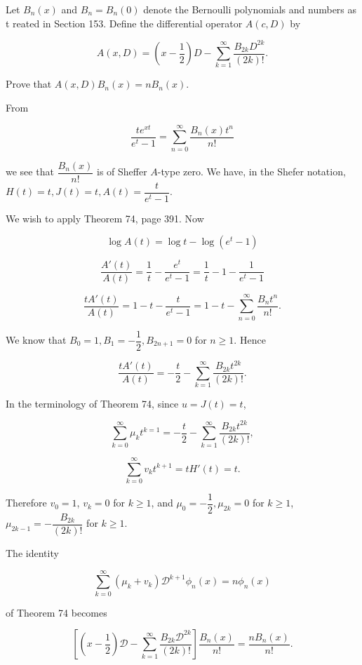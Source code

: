 \begin{problem}\label{problem2chapter18}
Let $B_n(x)$ and $B_n=B_n(0)$ denote the Bernoulli polynomials and numbers as t reated in Section 153. Define the differential operator $A(c,D)$ by 

$$A(x,D) = \left( x - \dfrac{1}{2} \right)D - \displaystyle\sum_{k=1}^{\infty} \dfrac{B_{2k}D^{2k}}{(2k)!}.$$

Prove that $A(x,D)B_n(x) = nB_n(x)$.
\end{problem}
\begin{solution}
From

$$\dfrac{te^{xt}}{e^t-1} = \displaystyle\sum_{n=0}^{\infty} \dfrac{B_n(x)t^n}{n!}$$

we see that $\dfrac{B_n(x)}{n!}$ is of Sheffer $A$-type zero. We have, in the Shefer notation, $H(t)=t, J(t)=t, A(t) = \dfrac{t}{e^t-1}.$ 

We wish to apply Theorem 74, page 391. Now 

$$\log A(t) = \log t - \log(e^t-1)$$

$$\dfrac{A'(t)}{A(t)} = \dfrac{1}{t} - \dfrac{e^t}{e^t-1} = \dfrac{1}{t} - 1 - \dfrac{1}{e^t-1}$$

$$\dfrac{tA'(t)}{A(t)} = 1-t-\dfrac{t}{e^t-1} = 1-t-\displaystyle\sum_{n=0}^{\infty} \dfrac{B_n t^n}{n!}.$$

We know that $B_0=1, B_1= -\dfrac{1}{2}, B_{2n+1}=0$ for $n \geq 1$. Hence

$$\dfrac{tA'(t)}{A(t)} = -\dfrac{t}{2} - \displaystyle\sum_{k=1}^{\infty} \dfrac{B_{2k}t^{2k}}{(2k)!}.$$

In the terminology of Theorem 74, since $u=J(t)=t$,

$$\displaystyle\sum_{k=0}^{\infty} \mu_k t^{k=1} = -\dfrac{t}{2} - \displaystyle\sum_{k=1}^{\infty} \dfrac{B_{2k}t^{2k}}{(2k)!},$$

$$\displaystyle\sum_{k=0}^{\infty} v_k t^{k+1} = t H'(t) = t.$$

Therefore $v_0=1$, $v_k=0$ for $k\geq 1$, and $\mu_0 = -\dfrac{1}{2}, \mu_{2k}=0$ for $k\geq 1$, $\mu_{2k-1} = -\dfrac{B_{2k}}{(2k)!}$ for $k \geq 1$.

The identity

$$\displaystyle\sum_{k=0}^{\infty} (\mu_k + v_k) \mathscr{D}^{k+1} \phi_n(x) = n \phi_n(x)$$

of Theorem 74 becomes

$$\left[ \left( x - \dfrac{1}{2} \right) \mathscr{D} - \displaystyle\sum_{k=1}^{\infty} \dfrac{B_{2k} \mathscr{D}^{2k}}{(2k)!} \right] \dfrac{B_n(x)}{n!} = \dfrac{n B_n(x)}{n!}.$$


\end{solution}

